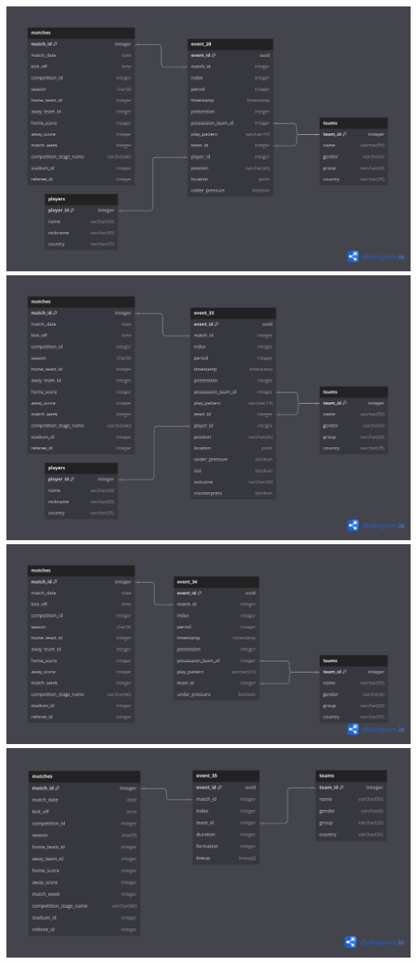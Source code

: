 \documentclass[12pt]{article}
\begin{document}
\includegraphics[width=\textwidth]{schema-diagram/event_28.png}
\includegraphics[width=\textwidth]{schema-diagram/event_33.png}
\includegraphics[width=\textwidth]{schema-diagram/event_34.png}
\includegraphics[width=\textwidth]{schema-diagram/event_35.png}
\end{document}
